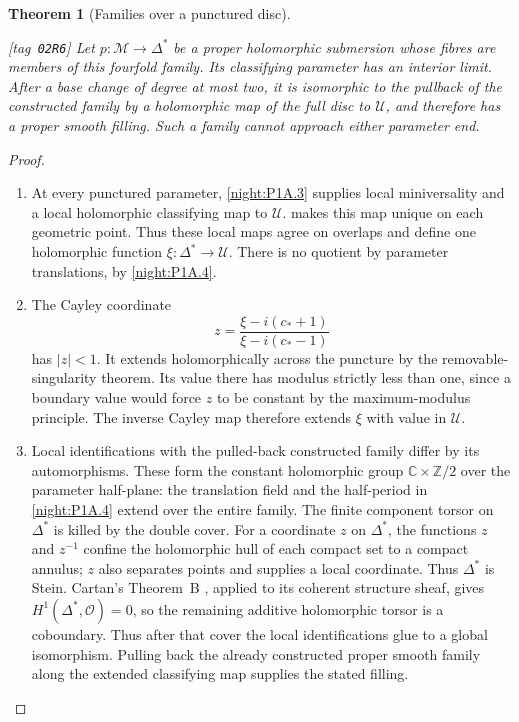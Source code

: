 \documentclass[11pt,a4paper]{article}
\numberwithin{equation}{section}
\newtheorem{theorem}{Theorem}[section]
\theoremstyle{definition}
\newcommand{\StatementRecord}[4]{{\upshape\footnotesize[tag~\texttt{#3}]}\enspace\ignorespaces}
\begin{document}
\begin{theorem}[Families over a punctured disc]\hypertarget{tag-02R6}{}\label{night:P1A.6}
\StatementRecord{night:P1A.6}{proved}{02R6}{\cref{night:P1A.3}, \cref{night:P1A.4}}
Let $p:\mathcal M\to\Delta^*$ be a proper holomorphic submersion
whose fibres are members of this fourfold family. Its classifying
parameter has an interior limit. After a base change of degree at most two, it is
isomorphic to the pullback of the constructed family by
a holomorphic map of the full disc to $\mathcal U$, and
therefore has a proper smooth filling. Such a family
cannot approach either parameter end.
\end{theorem}
\begin{proof}
\begin{enumerate}[label=\arabic*.]
\item At every punctured parameter, \cref{night:P1A.3} supplies local
miniversality and a local holomorphic classifying map to
$\mathcal U$.  makes this map unique on each geometric
point. Thus these local maps agree on overlaps and define
one holomorphic function $\xi:\Delta^*\to\mathcal U$.
There is no quotient by parameter translations, by \cref{night:P1A.4}.

\item The Cayley coordinate
\[
 z=\frac{\xi-i(c_*+1)}{\xi-i(c_*-1)}
\]
has $|z|<1$. It extends holomorphically across the puncture
by the removable-singularity theorem. Its value there has
modulus strictly less than one, since a boundary value
would force $z$ to be constant by the maximum-modulus
principle. The inverse Cayley map therefore extends
$\xi$ with value in $\mathcal U$.

\item Local identifications with the pulled-back constructed
family differ by its automorphisms. These form the constant
holomorphic group $\mathbb C\times\mathbb Z/2$ over the
parameter half-plane: the translation field and the
half-period in \cref{night:P1A.4} extend over the entire family.
The finite component torsor on $\Delta^*$ is killed by
the double cover. For a coordinate $z$ on $\Delta^*$, the functions $z$ and $z^{-1}$
confine the holomorphic hull of each compact set to a compact annulus;
$z$ also separates points and supplies a local coordinate. Thus
$\Delta^*$ is Stein. Cartan's Theorem~B
\cite[Expos\'e~19, \S5, pp.~19-14--19-15]{Cartan1952B_AB},
applied to its coherent structure sheaf, gives
$H^1(\Delta^*,\mathcal O)=0$, so the remaining additive
holomorphic torsor is a coboundary. Thus after that cover the local
identifications glue to a global isomorphism. Pulling
back the already constructed proper smooth family along
the extended classifying map supplies the stated filling.

\end{enumerate}
\end{proof}
\end{document}
